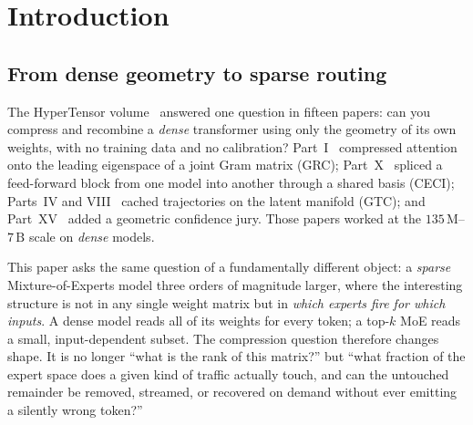 \documentclass[11pt]{article}
\begin{document}
\begin{abstract}
16-expert splice (code $3.000$), and shows the IQ2\_XS GPU tier to be a speed
tier, not a quality tier (mean perplexity $8.540$, degenerate token loops on
all five domains, against $2.653$ at Q3\_K). We
report the negative results as carefully as the positive ones: per-expert
low-rank factorisation, product quantisation, shared-basis factorisation, and
linear router refitting all \emph{lose} on this model, and we explain why. The
thesis is that a trillion-parameter MoE is best treated not as one compression
target but as a \emph{conditional} system --- conditional residency, precision,
and escalation --- with the contract ``compression failure $\Rightarrow$
progressive recovery,'' never silent wrong output.
\end{abstract}

\tableofcontents
\bigskip

\section{Introduction}
\label{sec:intro}

\subsection{From dense geometry to sparse routing}

The HyperTensor volume~\cite{stewart2026hypertensor} answered one question in
fifteen papers: can you compress and recombine a \emph{dense} transformer using
only the geometry of its own weights, with no training data and no calibration?
Part~I~\cite{stewart2026grc} compressed attention onto the leading eigenspace of
a joint Gram matrix (GRC); Part~X~\cite{stewart2026ceci} spliced a feed-forward
block from one model into another through a shared basis (CECI); Parts~IV and
VIII~\cite{stewart2026ott,stewart2026gtc} cached trajectories on the latent
manifold (GTC); and Part~XV~\cite{stewart2026cog} added a geometric confidence
jury. Those papers worked at the $135\,\textrm{M}$--$7\,\textrm{B}$ scale on
\emph{dense} models.

This paper asks the same question of a fundamentally different object: a
\emph{sparse} Mixture-of-Experts model three orders of magnitude larger, where
the interesting structure is not in any single weight matrix but in \emph{which
experts fire for which inputs}. A dense model reads all of its weights for every
token; a top-$k$ MoE reads a small, input-dependent subset. The compression
question therefore changes shape. It is no longer ``what is the rank of this
matrix?'' but ``what fraction of the expert space does a given kind of traffic
actually touch, and can the untouched remainder be removed, streamed, or
recovered on demand without ever emitting a silently wrong token?''
\end{document}

